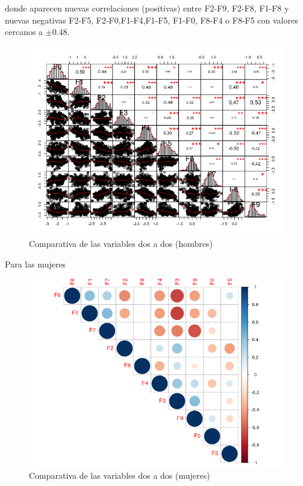 donde aparecen nuevas correlaciones (positivas) entre F2-F9, F2-F8, F1-F8 y nuevas negativas F2-F5, F2-F0,F1-F4,F1-F5, F1-F0, F8-F4 o F8-F5 con valores cercanos a $\pm 0.48$. 

\begin{figure}[H] %
	\centering
	\includegraphics[scale=0.8]{hombres-plot.png}  %
	\caption{Comparativa de las variables dos a dos (hombres)} 
	\label{fig:hombres-vowel}
\end{figure}

\newpage

Para las mujeres

\begin{figure}[H] %
	\centering
	\includegraphics[scale=0.75]{mujeres-flatten.png}  %
	\caption{Comparativa de las variables dos a dos (mujeres)} 
	\label{fig:mujeres-vowel1}
\end{figure}

